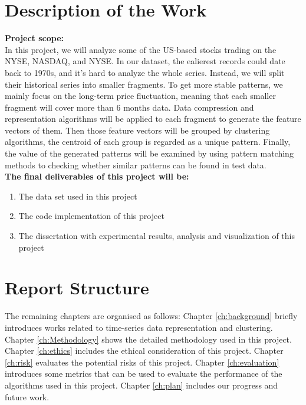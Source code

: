 \section{Description of the Work}
\textbf{Project scope:}\\
In this project, we will analyze some of the US-based stocks trading on the NYSE, NASDAQ, and NYSE. In our dataset, the ealierest records could date back to 1970s, and it's hard to analyze the whole series. Instead, we will split their historical series into smaller fragments. To get more stable patterns, we mainly focus on the long-term price fluctuation, meaning that each smaller fragment will cover more than 6 months data. Data compression and representation algorithms will be applied to each fragment to generate the feature vectors of them. Then those feature vectors will be grouped by clustering algorithms, the centroid of each group is regarded as a unique pattern. Finally, the value of the generated patterns will be examined by using pattern matching methods to checking whether similar patterns can be found in test data.
\\
\textbf{The final deliverables of this project will be:}
\begin{enumerate}
    \item The data set used in this project
    \item The code implementation of this project
    \item The dissertation with experimental results, analysis and visualization of this project
\end{enumerate}

\section{Report Structure}
The remaining chapters are organised as follows: Chapter \ref{ch:background} briefly introduces works related to time-series data representation and clustering. Chapter \ref{ch:Methodology} shows the detailed methodology used in this project. Chapter \ref{ch:ethics} includes the ethical consideration of this project. Chapter \ref{ch:risk} evaluates the potential risks of this project. Chapter \ref{ch:evaluation} introduces some metrics that can be used to evaluate the performance of the algorithms used in this project. Chapter \ref{ch:plan} includes our progress and future work.
